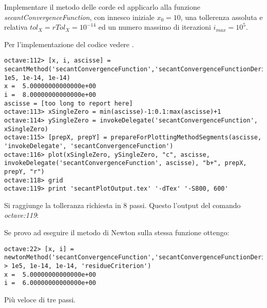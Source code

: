 \begin{exercise}
Implementare il metodo delle corde ed applicarlo alla funzione
\emph{secantConvergenceFunction}, con innesco iniziale $x_{0} = 10$, una
tollerenza assoluta e relativa $tol_{X} = rTol_{X} = 10^{-14}$ ed un numero massimo di iterazioni
$i_{max} = 10^{5}$.
\end{exercise}
Per l'implementazione del codice vedere .
\begin{lstlisting}
octave:112> [x, i, ascisse] = secantMethod('secantConvergenceFunction','secantConvergenceFunctionDerivative',10,
1e5, 1e-14, 1e-14) 
x =  5.00000000000000e+00
i =  8.00000000000000e+00
ascisse = [too long to report here]
octave:113> xSingleZero = min(ascisse)-1:0.1:max(ascisse)+1
octave:114> ySingleZero = invokeDelegate('secantConvergenceFunction', xSingleZero)
octave:115> [prepX, prepY] = prepareForPlottingMethodSegments(ascisse, 'invokeDelegate', 'secantConvergenceFunction')
octave:116> plot(xSingleZero, ySingleZero, "c", ascisse, invokeDelegate('secantConvergenceFunction', ascisse), "b+", prepX, prepY, "r")
octave:118> grid
octave:119> print 'secantPlotOutput.tex' '-dTex' '-S800, 600'
\end{lstlisting}
Si raggiunge la tolleranza richiesta in 8 passi. Questo l'output del comando
\emph{octave:119}:
\begin{center}

\end{center}
\begin{oss}
Se provo ad eseguire il metodo di Newton sulla stessa funzione ottengo:
\begin{lstlisting}
octave:22> [x, i] = newtonMethod('secantConvergenceFunction','secantConvergenceFunctionDerivative',10,
> 1e5, 1e-14, 1e-14, 'residueCriterion')
x =  5.00000000000000e+00
i =  6.00000000000000e+00
\end{lstlisting}
Pi\`u veloce di tre passi.
\end{oss}
